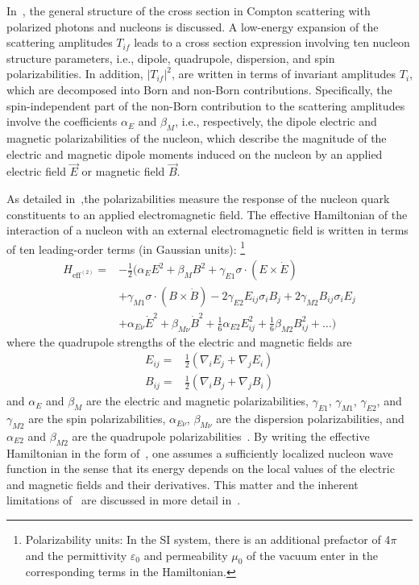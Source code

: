 In~\cite{Babusci:1998ww}, the general structure of the cross section in Compton scattering 
with polarized photons and nucleons is discussed. A low-energy expansion
of the scattering amplitudes $T_{if}$ leads to a cross section expression involving
ten nucleon structure parameters, i.e., dipole, quadrupole, dispersion, and
spin polarizabilities. In addition, $|T_{if}|^2$, are written in terms of invariant
amplitudes $T_i$, which are decomposed into Born and non-Born contributions.
Specifically, the spin-independent part of the non-Born contribution to the scattering amplitudes
involve the coefficients $\alpha_E$ and $\beta_M$, i.e., respectively, the
dipole electric and magnetic polarizabilities of the nucleon, which describe
the magnitude of the electric and magnetic dipole moments induced on the nucleon by an
applied electric field $\overrightarrow E$ or magnetic field $\overrightarrow B$\cite{Hagelstein:2020vog}.

 As detailed in~\cite{Detmold:2006vu},the polarizabilities measure the response of the 
 nucleon quark constituents to an applied electromagnetic field. The effective Hamiltonian 
 of the interaction of a nucleon with an external electromagnetic field
is written in terms of ten leading-order terms (in Gaussian units):
\footnote{Polarizability units: In the SI system, there is an additional prefactor of 4$\pi$ and the permittivity $\varepsilon_0$ and permeability $\mu_0$ of the vacuum enter in the corresponding terms in the Hamiltonian.}
\begin{equation}
\begin{split}
H_{\text{eff}^{(2)}}=&-\frac{1}{2}(\alpha_E E^2+\beta_M B^2
+\gamma_{E1}\sigma\cdot\left(E\times \dot E\right)\\
&+\gamma_{M1}\sigma\cdot \left(B\times \dot B\right)
-2\gamma_{E2}E_{ij}\sigma_iB_j+2\gamma_{M2}B_{ij}\sigma_iE_j\\
&+\alpha_{E\nu}\dot E^2+\beta_{M\nu}\dot B^2
+\frac{1}{6}\alpha_{E2}E_{ij}^2+\frac{1}{6}\beta_{M2}B_{ij}^2+\dots)
\end{split}
\label{Heffective}
\end{equation}
where the quadrupole strengths of the electric and magnetic fields are
\begin{equation}
\begin{split}
E_{ij}=&\frac{1}{2}\left(\nabla_iE_j+\nabla_jE_i\right)\\ 
B_{ij}=&\frac{1}{2}\left(\nabla_iB_j+\nabla_jB_i\right)
\end{split}
\end{equation}
and $\alpha_E$ and $\beta_M$ are the electric and magnetic
polarizabilities, $\gamma_{E1}$, $\gamma_{M1}$, $\gamma_{E2}$, and $\gamma_{M2}$ 
are the spin polarizabilities, $\alpha_{E\nu}$, $\beta_{M\nu}$ are the dispersion polarizabilities,
and $\alpha_{E2}$ and $\beta_{M2}$ are the quadrupole polarizabilities~\cite{Babusci:1998ww, Levchuk:1999zy}.
By writing the effective Hamiltonian in the form of~, one assumes a sufficiently
localized nucleon wave function in the sense that its energy depends on the local values of the
electric and magnetic fields and  their derivatives. This matter and the inherent limitations
of~ are discussed in more detail in~\cite{Saenz:2020yxy}.

